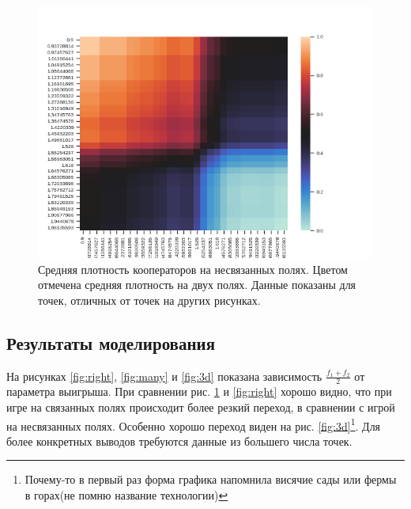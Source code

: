 \documentclass[12pt]{article}
\begin{document}
        \begin{figure}[H]
            \centering
            \includegraphics[width=0.95\columnwidth, keepaspectratio=True]{DoubleField/wrong.png}
            \caption{Средняя плотность кооператоров на несвязанных полях. Цветом отмечена средняя плотность на двух полях. Данные показаны для точек, отличных от точек на других рисунках.}
            \label{fig:wrong}
        \end{figure}

    \subsection{Результаты моделирования}
        На рисунках \ref{fig:right}, \ref{fig:many} и \ref{fig:3d} показана зависимость $\frac{f_1+f_2}{2}$ от параметра выигрыша. 
        При сравнении рис. \ref{fig:wrong} и \ref{fig:right} хорошо видно, что при игре на связанных полях происходит более резкий переход, в сравнении с игрой на несвязанных полях. Особенно хорошо переход виден на рис. \ref{fig:3d}\footnote{Почему-то в первый раз форма графика напомнила висячие сады или фермы в горах(не помню название технологии)}. Для более конкретных выводов требуются данные из большего числа точек.
        
\end{document}
